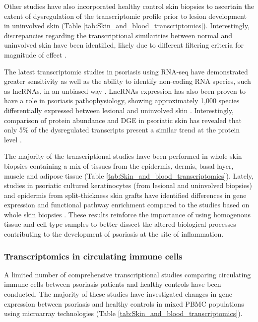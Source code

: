 Other studies have also incorporated healthy control skin biopsies to ascertain the extent of dysregulation of the transcriptomic profile prior to lesion development in uninvolved skin (Table \ref{tab:Skin_and_blood_transcriptomics}). Interestingly, discrepancies regarding the transcriptional similarities between normal and uninvolved skin have been identified, likely due to different filtering criteria for magnitude of effect \parencite{Keermann2015, Tsoi2015}.%

The latest transcriptomic studies in psoriasis using RNA-seq have demonstrated greater sensitivity as well as the ability to identify non-coding RNA species, such as lncRNAs, in an unbiased way \parencite{Jaabari2011, Li2014}. LncRNAs expression has also been proven to have a role in psoriasis pathophysiology, showing approximately 1,000 species differentially expressed between lesional and uninvolved skin \parencite{Tsoi2015}. Interestingly, comparison of protein abundance and DGE in psoriatic skin has revealed that only 5\% of the dysregulated transcripts present a similar trend at the protein level \parencite{Swindell2015}.   

The majority of the transcriptional studies have been performed in whole skin biopsies containing a mix of tissues from the epidermis, dermis, basal layer, muscle and adipose tissue (Table \ref{tab:Skin_and_blood_transcriptomics}). Lately, studies in psoriatic cultured keratinocytes (from lesional and uninvolved biopsies) and epidermis from split-thickness skin grafts have identified differences in gene expression and functional pathway enrichment compared to the studies based on whole skin biopsies \parencite{Swindell2017,Tervaniemi2016}. These results reinforce the importance of using homogenous tissue and cell type samples to better dissect the altered biological processes contributing to the development of psoriasis at the site of inflammation. 


\subsubsection{Transcriptomics in circulating immune cells}
A limited number of comprehensive transcriptional studies comparing circulating immune cells between psoriasis patients and healthy controls have been conducted. The majority of these studies have investigated changes in gene expression between psoriasis and healthy controls in mixed PBMC populations using microarray technologies (Table \ref{tab:Skin_and_blood_transcriptomics}). 


